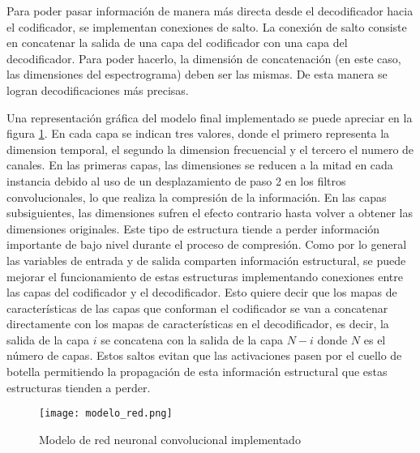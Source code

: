 Para poder pasar información de manera más directa desde el decodificador hacia el codificador, se implementan conexiones de salto. La conexión de salto consiste en concatenar la salida de una capa del codificador con una capa del decodificador. Para poder hacerlo, la dimensión de concatenación (en este caso, las dimensiones del espectrograma) deben ser las mismas. De esta manera se logran decodificaciones más precisas. 




Una representación gráfica del modelo final implementado se puede apreciar en la figura \ref{fig:modelo}. En cada capa se indican tres valores, donde el primero representa la dimension temporal, el segundo la dimension frecuencial y el tercero el numero de canales. En las primeras capas, las dimensiones se reducen a la mitad en cada instancia debido al uso de un desplazamiento de paso 2 en los filtros convolucionales, lo que realiza la compresión de la información. En las capas subsiguientes, las dimensiones sufren el efecto contrario hasta volver a obtener las dimensiones originales. Este tipo de estructura tiende a perder información importante de bajo nivel durante el proceso de compresión. Como por lo general las variables de entrada y de salida comparten información estructural, se puede mejorar el funcionamiento de estas estructuras implementando conexiones entre las capas del codificador y el decodificador. Esto quiere decir que los mapas de características de las capas que conforman el codificador se van a concatenar directamente con los mapas de características en el decodificador, es decir, la salida de la capa $i$ se concatena con la salida de la capa $N-i$ donde $N$ es el número de capas. Estos saltos evitan que las activaciones pasen por el cuello de botella permitiendo la propagación de esta información estructural que estas estructuras tienden a perder. 

\begin{figure}[H]
	\centering{}
	\texttt{[image: modelo\_red.png]}
	\caption{Modelo de red neuronal convolucional implementado}
	\label{fig:modelo}
\end{figure}

